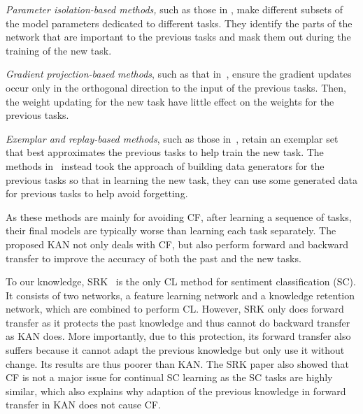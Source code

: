 \documentclass[runningheads]{llncs}
\begin{document}
\textit{Parameter isolation-based methods,} such as those in \cite{DBLP:conf/icml/SerraSMK18,DBLP:conf/cvpr/MallyaL18,fernando2017pathnet}, make different subsets of the model parameters dedicated to different tasks. They identify the parts of the network that are important to the previous tasks and mask them out during the training of the new task.

\textit{Gradient projection-based methods}, such as that in~\cite{zeng2019continuous}, ensure the gradient updates occur only in the orthogonal direction to the input of the previous tasks. Then, the {\color{black}weight updating} for the new task have little effect on the weights for the previous tasks. 

\textit{Exemplar and replay-based methods}, such as those in~\cite{Rebuffi2017,Lopez2017gradient,Chaudhry2019ICLR}, retain an exemplar set that best approximates the previous tasks to help train the new task. The methods in~\cite{Shin2017continual,Kamra2017deep,Rostami2019ijcai,He2018overcoming} instead took the approach of building data generators for the previous tasks so that in learning the new task, they can use some generated data for previous tasks to help avoid forgetting. 

As these methods are mainly for avoiding CF, after learning a sequence of tasks, their final models are typically worse than learning each task separately. The proposed KAN not only deals with CF, but also perform forward and backward transfer to improve the accuracy of both the past and the new tasks. 

To our knowledge, SRK~\cite{DBLP:conf/dasfaa/LvWLCZ19} is the only CL method for sentiment classification (SC). It consists of two networks, a feature learning network and a knowledge retention network, which are combined to perform CL. However, SRK only does forward transfer as it protects the past knowledge and thus cannot do backward transfer as KAN does. More importantly, due to this protection, its forward transfer also suffers because it cannot adapt the previous knowledge but only use it without change. Its results are thus poorer than KAN. The SRK paper also showed that CF is not a major issue for continual SC learning as the SC tasks are highly similar, which also explains why adaption of the previous knowledge in forward transfer in KAN does not cause CF. 
\end{document}
